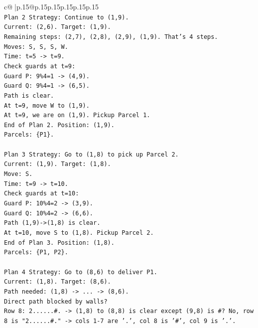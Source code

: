 \documentclass{article}
\begin{document}
{\begin{supertabular}{c@{$\;$}|p{.15\linewidth}@{}p{.15\linewidth}p{.15\linewidth}p{.15\linewidth}p{.15\linewidth}p{.15\linewidth}}
{{{\\ 
\texttt{Plan 2 Strategy: Continue to (1,9).} \\
\texttt{Current: (2,6). Target: (1,9).} \\
\texttt{Remaining steps: (2,7), (2,8), (2,9), (1,9). That's 4 steps.} \\
\texttt{Moves: S, S, S, W.} \\
\texttt{Time: t=5 {-}> t=9.} \\
\texttt{Check guards at t=9:} \\
\texttt{Guard P: 9\%4=1 {-}> (4,9).} \\
\texttt{Guard Q: 9\%4=1 {-}> (6,5).} \\
\texttt{Path is clear.} \\
\texttt{At t=9, move W to (1,9).} \\
\texttt{At t=9, we are on (1,9). Pickup Parcel 1.} \\
\texttt{End of Plan 2. Position: (1,9).} \\
\texttt{Parcels: \{P1\}.} \\
\\ 
\texttt{Plan 3 Strategy: Go to (1,8) to pick up Parcel 2.} \\
\texttt{Current: (1,9). Target: (1,8).} \\
\texttt{Move: S.} \\
\texttt{Time: t=9 {-}> t=10.} \\
\texttt{Check guards at t=10:} \\
\texttt{Guard P: 10\%4=2 {-}> (3,9).} \\
\texttt{Guard Q: 10\%4=2 {-}> (6,6).} \\
\texttt{Path (1,9){-}>(1,8) is clear.} \\
\texttt{At t=10, move S to (1,8). Pickup Parcel 2.} \\
\texttt{End of Plan 3. Position: (1,8).} \\
\texttt{Parcels: \{P1, P2\}.} \\
\\ 
\texttt{Plan 4 Strategy: Go to (8,6) to deliver P1.} \\
\texttt{Current: (1,8). Target: (8,6).} \\
\texttt{Path needed: (1,8) {-}> ... {-}> (8,6).} \\
\texttt{Direct path blocked by walls?} \\
\texttt{Row 8: 2......\#. {-}> (1,8) to (8,8) is clear except (9,8) is \#? No, row 8 is "2......\#." {-}> cols 1{-}7 are '.', col 8 is '\#', col 9 is '.'.} \\
}}}
\end{supertabular}}
\end{document}
